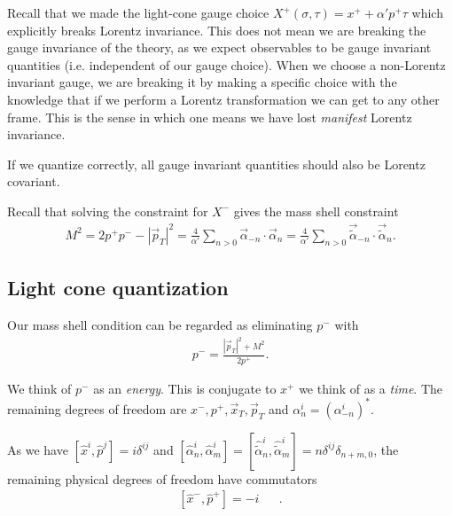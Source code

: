 
Recall that we made the light-cone gauge choice $X^{+}\left( \sigma, \tau \right) = x^{+} + \alpha' p^{+} \tau$ which explicitly breaks Lorentz invariance. This does not mean we are breaking the gauge invariance of the theory, as we expect observables to be gauge invariant quantities (i.e. independent of our gauge choice). When we choose a non-Lorentz invariant gauge, we are breaking it by making a specific choice with the knowledge that if we perform a Lorentz transformation we can get to any other frame. This is the sense in which one means we have lost \emph{manifest} Lorentz invariance.

If we quantize correctly, all gauge invariant quantities should also be Lorentz covariant.

Recall that solving the constraint for $X^{-}$ gives the mass shell constraint
\begin{align}
    M^2 = 2p^{+} p^{-} - \left| \vec{p}_T \right|^2 = \frac{4}{\alpha'} \sum_{n>0}^{} \vec{\alpha}_{-n} \cdot \vec{\alpha}_n = \frac{4}{\alpha'} \sum_{n > 0}^{} \vec{\widetilde{\alpha}}_{-n} \cdot \vec{\widetilde{\alpha}}_{n}
.\end{align}

\subsection{Light cone quantization}

Our mass shell condition can be regarded as eliminating $p^{-}$ with
\begin{align}
    p^{-} = \frac{\left| \vec{p}_T \right|^2 + M^2}{2p^{+}}
.\end{align}

We think of $p^{-}$ as an \emph{energy}. This is conjugate to $x^{+}$ we think of as a \emph{time}. The remaining degrees of freedom are $x^{-}, p^{+}, \vec{x}_T, \vec{p}_T$ and $\alpha^{i}_n = \left( \alpha^{i}_{-n} \right)^{*}$.

As we have $\left[ \hat{x}^{i}, \hat{p}^{j} \right] = i \delta^{ij}$ and $\left[ \hat{\alpha}_n^{i}, \hat{\alpha}_m^{i} \right] = \left[ \hat{\widetilde{\alpha}}_n^{i}, \hat{\widetilde{\alpha}}_m^{i} \right] = n \delta^{ij}\delta_{n + m,0} $, the remaining physical degrees of freedom have commutators
\begin{align}
    \left[ \hat{x}^{-}, \hat{p}^{+} \right] = - i && 
.\end{align}

